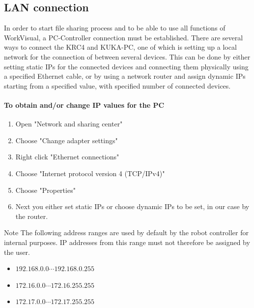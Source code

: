 	\subsection{LAN connection}
	In order to start file sharing process and to be able to use all functions of WorkVisual, a PC-Controller connection must be established. There are several ways to connect the KRC4 and KUKA-PC, one of which is setting up a local network for the connection of between several devices. This can be done by either setting static IPs for the connected devices and connecting them physically using a specified Ethernet cable, or by using a network router and assign dynamic IPs starting from a specified value, with specified number of connected devices. 

	\paragraph{To obtain and/or change IP values for the PC}
	\begin{enumerate}
		\item Open "Network and sharing center" 
		\item Choose "Change adapter settings"
		\item Right click "Ethernet connections"
		\item  Choose "Internet protocol version 4 (TCP/IPv4)"
		\item  Choose "Properties"
		\item Next you either set static IPs or choose dynamic IPs to be set, in our case by the router.
	\end{enumerate}
	 \begin{mynotebox}{Note}
The following address ranges are used by default by the
robot controller for internal purposes. IP addresses from
this range must not therefore be assigned by the user.
\begin{itemize}
    \item $192.168.0.0 \cdots 192.168.0.255$
    \item $172.16.0.0 \cdots 172.16.255.255$
    \item $172.17.0.0 \cdots 172.17.255.255$
\end{itemize}
    \end{mynotebox}

